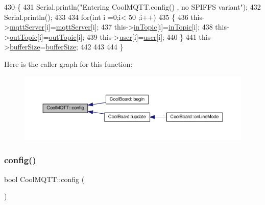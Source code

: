 \begin{DoxyCode}
430 \{
431     Serial.println(\textcolor{stringliteral}{"Entering CoolMQTT.config() , no SPIFFS variant"});
432     Serial.println();
433 
434     \textcolor{keywordflow}{for}(\textcolor{keywordtype}{int} i =0;i< 50 ;i++)
435     \{
436         this->\hyperlink{classCoolMQTT_ab8bb951f87ddbf92db74c2ad16a3e53e}{mqttServer}[i]=\hyperlink{classCoolMQTT_ab8bb951f87ddbf92db74c2ad16a3e53e}{mqttServer}[i];
437         this->\hyperlink{classCoolMQTT_a4492f52a441e83cc5151010317fdb52d}{inTopic}[i]=\hyperlink{classCoolMQTT_a4492f52a441e83cc5151010317fdb52d}{inTopic}[i];
438         this->\hyperlink{classCoolMQTT_a109c786a17b463f9eeba046194279522}{outTopic}[i]=\hyperlink{classCoolMQTT_a109c786a17b463f9eeba046194279522}{outTopic}[i];
439         this->\hyperlink{classCoolMQTT_a8cd47e45d457f908d4b4390b35aaee83}{user}[i]=\hyperlink{classCoolMQTT_a8cd47e45d457f908d4b4390b35aaee83}{user}[i];
440     \}
441     this->\hyperlink{classCoolMQTT_a7f3cf26b51d6770f216e42c5ef13ca9f}{bufferSize}=\hyperlink{classCoolMQTT_a7f3cf26b51d6770f216e42c5ef13ca9f}{bufferSize};
442     
443 
444 \}
\end{DoxyCode}
Here is the caller graph for this function\+:\nopagebreak
\begin{figure}[H]
\begin{center}
\leavevmode
\includegraphics[width=350pt]{classCoolMQTT_a9b703de4f1358f0ee7a5e8c44979c648_icgraph}
\end{center}
\end{figure}
\mbox{\label{classCoolMQTT_a6571671781a505feca9a8a56e256c6bc}} 
\subsubsection{\texorpdfstring{config()}{config()}\hspace{0.1cm}{\footnotesize\ttfamily [2/2]}}
{\footnotesize\ttfamily bool Cool\+M\+Q\+T\+T\+::config (\begin{DoxyParamCaption}{ }\end{DoxyParamCaption})}

